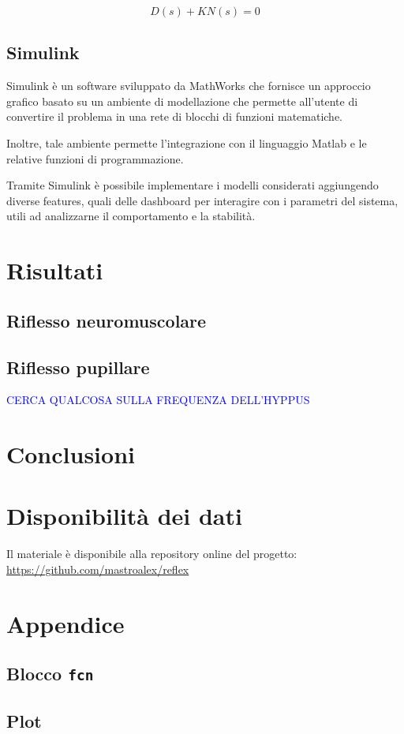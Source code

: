 \begin{equation}
D(s)+KN(s)=0
\end{equation}




\subsection{Simulink}

Simulink \cite{simulink} è un software sviluppato da MathWorks che fornisce un approccio grafico basato su un ambiente di modellazione che permette all’utente di convertire il problema in una rete di blocchi di funzioni matematiche.

Inoltre, tale ambiente permette l’integrazione con il linguaggio Matlab e le relative funzioni di programmazione.

Tramite Simulink è possibile implementare i modelli considerati aggiungendo diverse features, quali delle dashboard per interagire con i parametri del sistema, utili ad analizzarne il comportamento e la stabilità.

\section{Risultati}
\textcolor{blue}{\lipsum[1-5]}


\subsection{Riflesso neuromuscolare}



\subsection{Riflesso pupillare}

\textcolor{blue}{CERCA QUALCOSA SULLA FREQUENZA DELL'HYPPUS}

\section{Conclusioni}

\textcolor{blue}{\lipsum[1-2]}
\raggedbottom
\pagebreak
\section*{Disponibilità dei dati}

Il materiale è disponibile alla repository online del progetto: \url{https://github.com/mastroalex/reflex}


\raggedbottom
\printbibliography[title=Riferimenti]

\clearpage
\onecolumn
\section*{Appendice}

\subsection{Blocco \texttt{fcn}}

\subsection{Plot}




